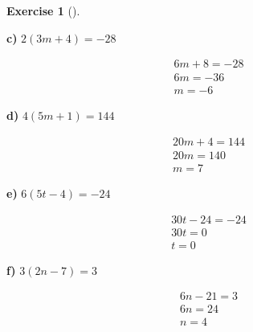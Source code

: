 \documentclass[
  letterpaper,
  DIV=11,
  numbers=noendperiod]{scrreprt}
\theoremstyle{definition}
\newtheorem{exercise}{Exercise}[chapter]
\theoremstyle{remark}
\begin{document}
\begin{exercise}[]
\begin{tcolorbox}
\textbf{c)} \(\displaystyle 2(3m + 4) = -28\)

\begin{align*}
6m + 8 = -28 \\ 6m = -36 \\ m = -6
\end{align*}

\textbf{d)} \(\displaystyle 4(5m + 1) = 144\)

\begin{align*}
20m + 4 = 144 \\ 20m = 140 \\ m = 7
\end{align*}

\textbf{e)} \(\displaystyle 6(5t - 4) = -24\)

\begin{align*}
30t - 24 = -24 \\ 30t = 0 \\ t = 0
\end{align*}

\textbf{f)} \(\displaystyle 3(2n - 7) = 3\)

\begin{align*}
6n - 21 = 3 \\ 6n = 24 \\ n = 4
\end{align*}

\end{tcolorbox}

\end{exercise}
\end{document}
